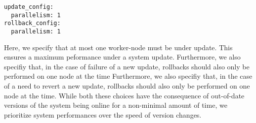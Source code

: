 \begin{lstlisting}
update_config:
  parallelism: 1
rollback_config:
  parallelism: 1
\end{lstlisting}

Here, we specify that at most one worker-node must be under update. This ensures a maximum peformance under a system update.
Furthermore, we also specifiy that, in the case of failure of a new update, rollbacks should also only be performed on one node at the time
Furthermore, we also specifiy that, in the case of a need to revert a new update, rollbacks should also only be performed on one node at the time.
While both these choices have the consequence of out-of-date versions of the system being online for a non-minimal amount of time, we prioritize system performances over the speed of version changes.







